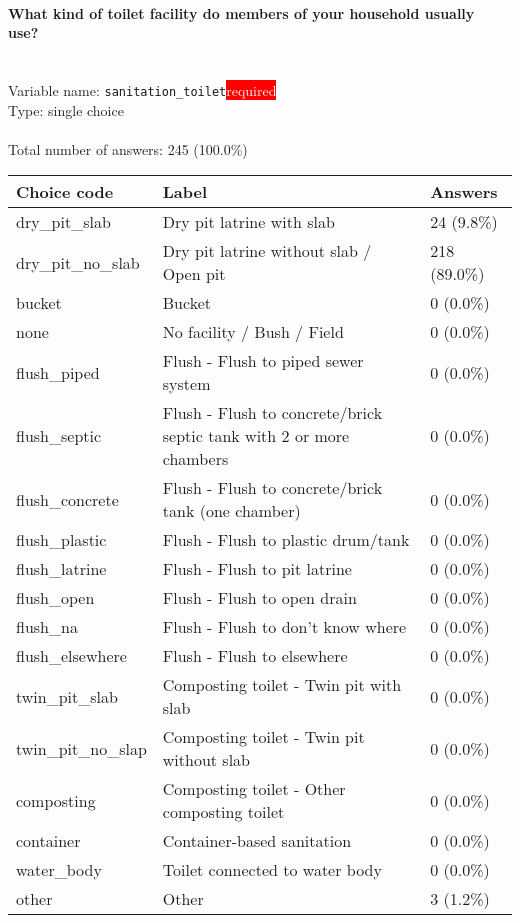 \documentclass[11.5pt, a4paper]{scrartcl}
\begin{document}
\paragraph{What kind of toilet facility do members of your household usually use? }
\  \\Variable name: \texttt{sanitation\_toilet}\hfill\colorbox{red}{\small{\textcolor{white}{required}}}\\
 Type: single choice\\
\\Total number of answers: 245 (100.0\%)
\\[0.2em] \begin{tabular}{p{4cm}|p{8cm}|p{3cm}}
Choice code & Label & Answers \\
\hline
dry\_pit\_slab & Dry pit latrine with slab& \cellcolor{color0}24 (9.8\%)\\
\cellcolor{mygray} dry\_pit\_no\_slab & \cellcolor{mygray}Dry pit latrine without slab / Open pit & \cellcolor{color4}218 (89.0\%)\\
bucket & Bucket& \cellcolor{color0}0 (0.0\%)\\
\cellcolor{mygray} none & \cellcolor{mygray}No facility / Bush / Field  & \cellcolor{color0}0 (0.0\%)\\
flush\_piped & Flush - Flush to piped sewer system& \cellcolor{color0}0 (0.0\%)\\
\cellcolor{mygray} flush\_septic & \cellcolor{mygray}Flush - Flush to concrete/brick septic tank with 2 or more chambers & \cellcolor{color0}0 (0.0\%)\\
flush\_concrete & Flush - Flush to concrete/brick tank (one chamber)& \cellcolor{color0}0 (0.0\%)\\
\cellcolor{mygray} flush\_plastic & \cellcolor{mygray}Flush - Flush to plastic drum/tank & \cellcolor{color0}0 (0.0\%)\\
flush\_latrine & Flush - Flush to pit latrine& \cellcolor{color0}0 (0.0\%)\\
\cellcolor{mygray} flush\_open & \cellcolor{mygray}Flush - Flush to open drain & \cellcolor{color0}0 (0.0\%)\\
flush\_na & Flush - Flush to don’t know where& \cellcolor{color0}0 (0.0\%)\\
\cellcolor{mygray} flush\_elsewhere & \cellcolor{mygray}Flush - Flush to elsewhere  & \cellcolor{color0}0 (0.0\%)\\
twin\_pit\_slab & Composting toilet - Twin pit with slab& \cellcolor{color0}0 (0.0\%)\\
\cellcolor{mygray} twin\_pit\_no\_slap & \cellcolor{mygray}Composting toilet - Twin pit without slab & \cellcolor{color0}0 (0.0\%)\\
composting & Composting toilet - Other composting toilet& \cellcolor{color0}0 (0.0\%)\\
\cellcolor{mygray} container & \cellcolor{mygray}Container-based sanitation  & \cellcolor{color0}0 (0.0\%)\\
water\_body & Toilet connected to water body& \cellcolor{color0}0 (0.0\%)\\
\cellcolor{mygray} other & \cellcolor{mygray}Other  & \cellcolor{color0}3 (1.2\%)\\
\end{tabular}
\end{document}
